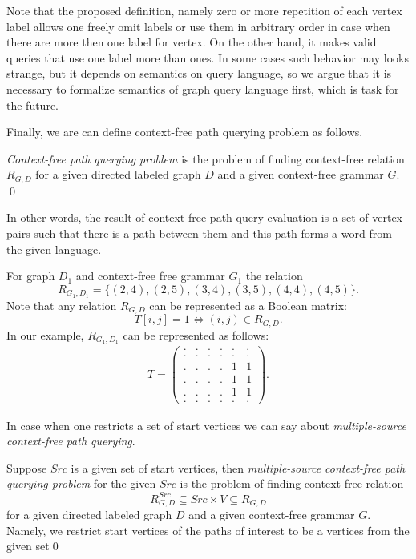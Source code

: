 Note that the proposed definition, namely zero or more repetition of each vertex label allows one freely omit labels or use them in arbitrary order in case when there are more then one label for vertex. 
On the other hand, it makes valid queries that use one label more than ones. 
In some cases such behavior may looks strange, but it depends on semantics on query language, so we argue that it is necessary to formalize semantics of graph query language first, which is task for the future.  

Finally, we are can define context-free path querying problem as follows. 
\begin{definition}
    \emph{Context-free path querying problem} is the problem of finding context-free relation $R_{G, D}$ for a given directed labeled graph $D$ and a given context-free grammar $G$. \qed
\end{definition} 

In other words, the result of context-free path query evaluation is a set of vertex pairs such that there is a path between them and this path forms a word from the given language.
    
For graph $D_1$ and context-free free grammar $G_1$ the relation $$R_{G_1, D_1} = \{(2, 4), (2, 5), (3, 4), (3, 5), (4, 4), (4, 5)\}.$$ 
Note that any relation $R_{G, D}$ can be represented as a Boolean matrix: $$T[i,j] = 1 \iff (i,j) \in R_{G, D}.$$
In our example, $R_{G_1, D_1}$ can be represented as follows:
{
    \renewcommand{\arraystretch}{0.7}
    \setlength\arraycolsep{2pt}
\begin{align*}
T =
\begin{pmatrix}
    . & . & . & . & . & . \\
    . & . & . & . & . & . \\
    . & . & . & . & 1 & 1 \\
    . & . & . & . & 1 & 1 \\ 
    . & . & . & . & 1 & 1 \\ 
    . & . & . & . & . & .
\end{pmatrix}.
\end{align*}
}

In case when one restricts a set of start vertices we can say about \textit{multiple-source context-free path querying}.

\begin{definition}
    Suppose $Src$ is a given set of start vertices, then \textit{multiple-source context-free path querying problem} for the given $Src$ is the problem of finding context-free relation $$R_{G, D}^{Src} \subseteq Src\times V \subseteq R_{G,D}$$ for a given directed labeled graph $D$ and a given context-free grammar $G$. Namely, we restrict start vertices of the paths of interest to be a vertices from the given set\qed
\end{definition}

